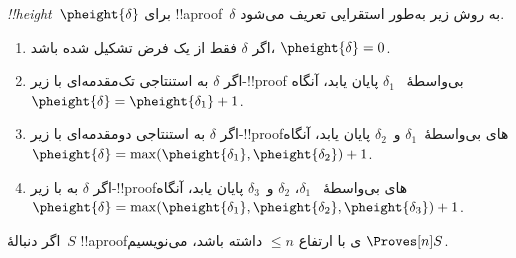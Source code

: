\documentclass[../../../include/open-logic-section]{subfiles}
\begin{document}
\begin{defn}
\emph{!!{height}}~$\pheight{\delta}$ برای !!a{proof}~$\delta$ به روش
زیر به‌طور استقرایی تعریف می‌شود.
\begin{enumerate}
  \item اگر $\delta$ فقط از یک فرض تشکیل شده باشد،
  $\pheight{\delta}=0$.
  \item اگر $\delta$ به استنتاجی تک‌مقدمه‌ای با زیر-!!{proof} بی‌واسطهٔ
  ~‌$\delta_1$ پایان یابد، آنگاه
  $\pheight{\delta}=\pheight{\delta_1}+1$.
  \item اگر $\delta$ به استنتاجی دومقدمه‌ای با زیر-!!{proof}های
  بی‌واسطهٔ~$\delta_1$ و~$\delta_2$ پایان یابد، آنگاه
  $\pheight{\delta}=\max(\pheight{\delta_1},\pheight{\delta_2})+1$.
  \item اگر $\delta$ به \Elim{\lor} با زیر-!!{proof}های بی‌واسطهٔ
  ~‌$\delta_1$، $\delta_2$ و~$\delta_3$ پایان یابد، آنگاه
  $\pheight{\delta}=
  \max(\pheight{\delta_1},\pheight{\delta_2},\pheight{\delta_3})+1$.
\end{enumerate}
اگر دنبالهٔ~$S$ !!a{proof}ی با ارتفاع $\le n$ داشته باشد، می‌نویسیم
$\Proves[n] S$.
\end{defn}
\end{document}

